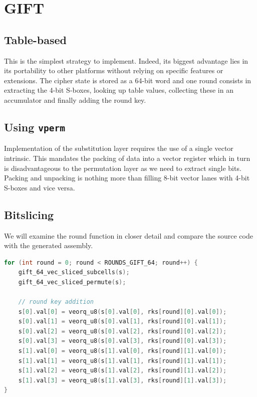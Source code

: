 \section{GIFT}
\subsection{Table-based}

This is the simplest strategy to implement. Indeed, its biggest advantage lies
in its portability to other platforms without relying on specific features or
extensions. The cipher state is stored as a 64-bit word and one round consists
in extracting the 4-bit S-boxes, looking up table values, collecting these in
an accumulator and finally adding the round key.




\subsection{Using \texttt{vperm}}

Implementation of the substitution layer requires the use of a single vector
intrinsic. This mandates the packing of data into a vector register which in
turn is disadvantageous to the permutation layer as we need to extract single
bits. Packing and unpacking is nothing more than filling 8-bit vector lanes
with 4-bit S-boxes and vice versa.





\subsection{Bitslicing}

We will examine the round function in closer detail and compare the source code
with the generated assembly.
\pagebreak

\begin{lstlisting}[language=c, caption={Round function src}]
for (int round = 0; round < ROUNDS_GIFT_64; round++) {
    gift_64_vec_sliced_subcells(s);
    gift_64_vec_sliced_permute(s);

    // round key addition
    s[0].val[0] = veorq_u8(s[0].val[0], rks[round][0].val[0]);
    s[0].val[1] = veorq_u8(s[0].val[1], rks[round][0].val[1]);
    s[0].val[2] = veorq_u8(s[0].val[2], rks[round][0].val[2]);
    s[0].val[3] = veorq_u8(s[0].val[3], rks[round][0].val[3]);
    s[1].val[0] = veorq_u8(s[1].val[0], rks[round][1].val[0]);
    s[1].val[1] = veorq_u8(s[1].val[1], rks[round][1].val[1]);
    s[1].val[2] = veorq_u8(s[1].val[2], rks[round][1].val[2]);
    s[1].val[3] = veorq_u8(s[1].val[3], rks[round][1].val[3]);
}
\end{lstlisting}


